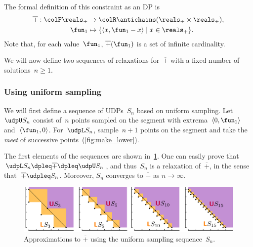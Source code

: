 The formal definition of this constraint as an DP is
\begin{align*}
\overline{+}:{\colF\reals_{+}} & \rightarrow{\colR\antichains(\reals_{+}\times\reals_{+})},\\
\fun_{1} & \mapsto\{\left\langle x,\fun_{1}-x\right\rangle \mid x\in\reals_{+}\}.
\end{align*}
Note that, for each value~$\fun_{1}$, $\overline{+}(\fun_{1})$
is a set of infinite cardinality.

We will now define two sequences of relaxations for~$\overline{+}$
with a fixed number of solutions~$n\geq1$.

\subsubsection*{Using uniform sampling}

We will first define a sequence of UDPs~$S_{n}$ based on uniform
sampling. Let~$\udpU S_{n}$ consist of~$n$ points sampled on the
segment with extrema~$\left\langle 0,\fun_{1}\right\rangle $ and~$\left\langle \fun_{1},0\right\rangle $.
For~$\udpL S_{n}$, sample~$n+1$ points on the segment and take
the \emph{meet} of successive points~(\cref{fig:make_lower}).
\begin{center}
\par\end{center}

The first elements of the sequences are shown in~\cref{fig:approx_invplus}.
One can easily prove that $\udpL S_{n}\dpleq\overline{+}\dpleq\udpU S_{n}$,
and thus~$S_{n}$ is a relaxation of~$\overline{+}$, in the sense
that~$\overline{+}\udpleq S_{n}$. Moreover, $S_{n}$ converges to
$\overline{+}$ as $n\rightarrow\infty$.
\begin{center}
\begin{figure}[h]
\centering{}\includegraphics[scale=0.33]{unc_sampling}\caption{\label{fig:approx_invplus}Approximations to $\overline{+}$ using
the uniform sampling sequence~$S_{n}$. }
\end{figure}
\par\end{center}

